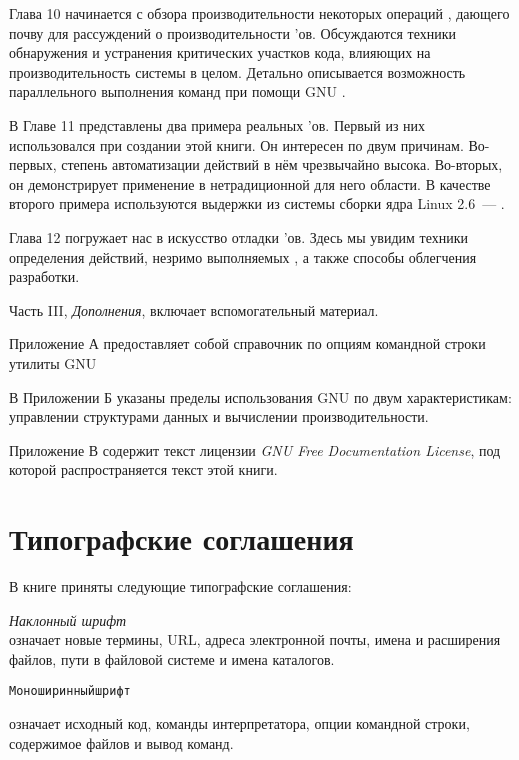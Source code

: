 Глава 10 начинается с обзора производительности некоторых операций
\GNUmake{}, дающего почву для рассуждений о производительности
\Makefile{}'ов. Обсуждаются техники обнаружения и устранения
критических участков кода, влияющих на производительность системы в
целом. Детально описывается возможность параллельного выполнения
команд при помощи GNU \GNUmake{}.

В Главе 11 представлены два примера реальных \Makefile{}'ов.
Первый из них использовался при создании этой книги. Он интересен по
двум причинам. Во-первых, степень автоматизации действий в нём
чрезвычайно высока. Во-вторых, он демонстрирует применение \GNUmake{}
в нетрадиционной для него области. В качестве второго примера
используются выдержки из системы сборки ядра Linux 2.6~---
.

Глава 12 погружает нас в искусство отладки \Makefile{}'ов. Здесь мы
увидим техники определения действий, незримо выполняемых \GNUmake{}, а
также способы облегчения разработки.

Часть III, \textit{Дополнения}, включает вспомогательный материал.

Приложение А предоставляет собой справочник по опциям командной строки
утилиты GNU \GNUmake{}

В Приложении Б указаны пределы использования GNU \GNUmake{} по двум
характеристикам: управлении структурами данных и вычислении
производительности.

Приложение В содержит текст лицензии \emph{GNU Free Documentation
  License}, под которой распространяется текст этой книги.

\section*{Типографские соглашения}
В книге приняты следующие типографские соглашения:

{\flushleft \textit{Наклонный шрифт}\\[1em] означает новые термины,
URL, адреса электронной почты, имена и расширения файлов, пути в
файловой системе и имена каталогов.}

\begin{alltt}
Моноширинный шрифт
\end{alltt}
означает исходный код, команды интерпретатора, опции командной строки,
содержимое файлов и вывод команд.

